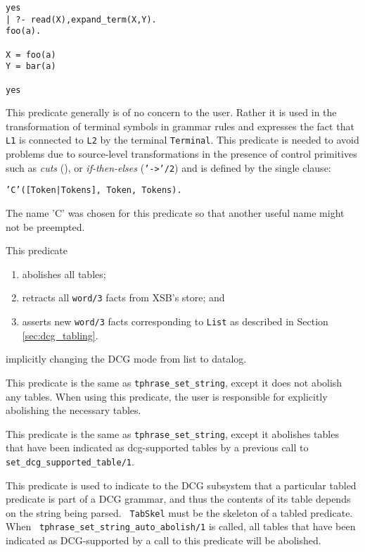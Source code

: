 \begin{description}
\begin{verbatim}
yes
| ?- read(X),expand_term(X,Y).
foo(a).

X = foo(a)
Y = bar(a)

yes
\end{verbatim}




This predicate generally is of no concern to the user.  Rather it is used 
    in the transformation of terminal symbols in 
    grammar rules and expresses the fact that {\tt L1} is connected 
    to {\tt L2} by the terminal {\tt Terminal}. This predicate is
    needed to avoid problems due to source-level
    transformations in the presence of control primitives such as
    {\em cuts} (\cut), or {\em if-then-elses} 
    ({\tt '->'/2}) and is defined by the single clause:
    \begin{center}
                {\tt 'C'([Token|Tokens], Token, Tokens).}
    \end{center}
    The name 'C' was chosen for this predicate so that another useful
    name might not be preempted.

This predicate 

\begin{enumerate}
\item abolishes all tables;
\item retracts all {\tt word/3} facts from XSB's store; and
\item asserts new {\tt word/3} facts corresponding to {\tt List} as
described in Section \ref{sec:dcg_tabling}.
\end{enumerate}

\noindent
implicitly changing the DCG mode from list to datalog.

This predicate is the same as {\tt tphrase\_set\_string}, except
it does not abolish any tables.  When using this predicate, the
user is responsible for explicitly abolishing the necessary tables.

This predicate is the same as {\tt tphrase\_set\_string}, except
it abolishes tables that have been indicated as dcg-supported tables
by a previous call to {\tt set\_dcg\_supported\_table/1}.

This predicate is used to indicate to the DCG subsystem that a
particular tabled predicate is part of a DCG grammar, and thus the
contents of its table depends on the string being parsed.  {\tt
TabSkel} must be the skeleton of a tabled predicate.  When {\tt
tphrase\_set\_string\_auto\_abolish/1} is called, all tables that have
been indicated as DCG-supported by a call to this predicate will be
abolished.


\end{description}
